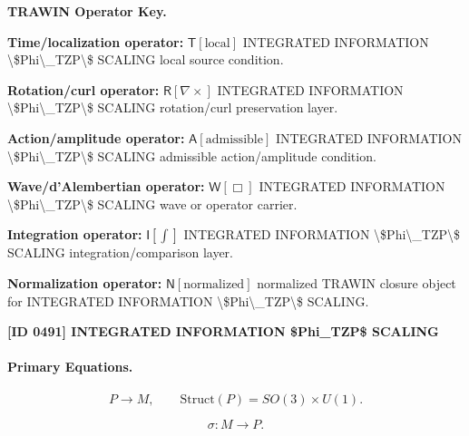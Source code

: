 \par\vspace{0.45\baselineskip}
\noindent\begin{minipage}[t]{\linewidth}
\begingroup
\small
\raggedright
\textbf{TRAWIN Operator Key.}\par
\noindent\textbf{Time/localization operator:} $\mathsf{T}\!\left[\mathrm{local}\right]$ INTEGRATED INFORMATION \textbackslash{}\$Phi\textbackslash{}\_TZP\textbackslash{}\$ SCALING local source condition.\par
\noindent\textbf{Rotation/curl operator:} $\mathsf{R}\!\left[\nabla\times\right]$ INTEGRATED INFORMATION \textbackslash{}\$Phi\textbackslash{}\_TZP\textbackslash{}\$ SCALING rotation/curl preservation layer.\par
\noindent\textbf{Action/amplitude operator:} $\mathsf{A}\!\left[\mathrm{admissible}\right]$ INTEGRATED INFORMATION \textbackslash{}\$Phi\textbackslash{}\_TZP\textbackslash{}\$ SCALING admissible action/amplitude condition.\par
\noindent\textbf{Wave/d'Alembertian operator:} $\mathsf{W}\!\left[\Box\right]$ INTEGRATED INFORMATION \textbackslash{}\$Phi\textbackslash{}\_TZP\textbackslash{}\$ SCALING wave or operator carrier.\par
\noindent\textbf{Integration operator:} $\mathsf{I}\!\left[\int\right]$ INTEGRATED INFORMATION \textbackslash{}\$Phi\textbackslash{}\_TZP\textbackslash{}\$ SCALING integration/comparison layer.\par
\noindent\textbf{Normalization operator:} $\mathsf{N}\!\left[\mathrm{normalized}\right]$ normalized TRAWIN closure object for INTEGRATED INFORMATION \textbackslash{}\$Phi\textbackslash{}\_TZP\textbackslash{}\$ SCALING.\par
\endgroup
\end{minipage}

\clearpage
\noindent\textbf{[ID 0491] INTEGRATED INFORMATION \$Phi\_TZP\$ SCALING}\par
\vspace{0.35em}
\paragraph{Primary Equations.}
\begin{equation}
P \longrightarrow M,
\qquad
\mathrm{Struct}(P)=SO(3)\times U(1).
\end{equation}

\begin{equation}
\sigma:M\longrightarrow P.
\end{equation}

